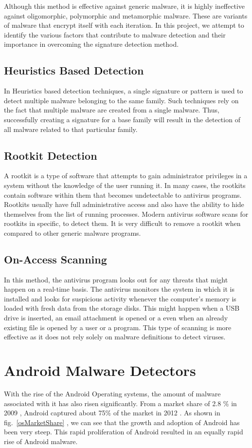 	Although this method is effective against generic malware, it is highly ineffective against oligomorphic, polymorphic and metamorphic malware. These are variants of malware that encrypt itself with each iteration. In this project, we attempt to identify the various factors that contribute to malware detection and their importance in overcoming the signature detection method.

\subsection{Heuristics Based Detection}
	In Heuristics based detection techniques, a single signature or pattern is used to detect multiple malware belonging to the same family. Such techniques rely on the fact that multiple malware are created from a single malware. Thus, successfully creating a signature for a base family will result in the detection of all malware related to that particular family.
\subsection{Rootkit Detection}
	A rootkit is a type of software that attempts to gain administrator privileges in a system without the knowledge of the user running it. In many cases, the rootkits contain software within them that becomes undetectable to antivirus programs. Rootkits usually have full administrative access and also have the ability to hide themselves from the list of running processes. Modern antivirus software scans for rootkits in specific, to detect them. It is very difficult to remove a rootkit when compared to other generic malware programs.
\subsection{On-Access Scanning}
	In this method, the antivirus program looks out for any threats that might happen on a real-time basis. The antivirus monitors the system in which it is installed and looks for suspicious activity whenever the computer's memory is loaded with fresh data from the storage disks. This might happen when a USB drive is inserted, an email attachment is opened or a even when an already existing file is opened by a user or a program.
	This type of scanning is more effective as it does not rely solely on malware definitions to detect viruses.

\section{Android Malware Detectors}
	With the rise of the Android Operating systems, the amount of malware associated with it has also risen significantly. From a market share of 2.8 \% in 2009 \cite{androidShare2009} , Android captured about 75\% of the market in 2012 \cite{androidShare2009}. As shown in fig.~\ref{osMarketShare} , we can see that the growth and adoption of Android has been very steep. This rapid proliferation of Android resulted in an equally rapid rise of Android malware.
	
